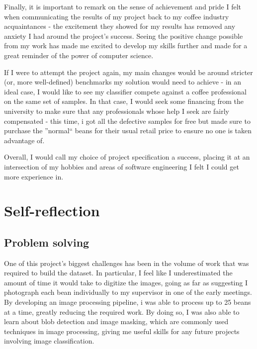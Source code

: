 \documentclass[12pt]{article}
\begin{document}
    Finally, it is important to remark on the sense of achievement and pride I felt when communicating the results of my project back to my
    coffee industry acquaintances - the excitement they showed for my results has removed any anxiety I had around the project's success.
    Seeing the positive change possible from my work has made me excited to develop my skills further and made for a great reminder of the power of computer science.

    If I were to attempt the project again, my main changes would be around stricter (or, more well-defined) benchmarks my solution would need to achieve -
    in an ideal case, I would like to see my classifier compete against a coffee professional on the same set of samples.
    In that case, I would seek some financing from the university to make sure that any professionals whose help I seek are fairly compensated -
    this time, i got all the defective samples for free but made sure to purchase the ''normal`` beans for their usual retail price to ensure no one is taken advantage of.

    Overall, I would call my choice of project specification a success, placing it at an intersection of my hobbies and areas of software engineering I felt I could get more experience in.

    \section{Self-reflection}
    \label{sec:section-2}

    \subsection{Problem solving}
    \label{subsec:problem-solving}
    One of this project's biggest challenges has been in the volume of work that was required to build the dataset.
    In particular, I feel like I underestimated the amount of time it would take to digitize the images, going as far as
    suggesting I photograph each bean individually to my supervisor in one of the early meetings.
    By developing an image processing pipeline, i was able to process up to 25 beans at a time, greatly reducing the required work.
    By doing so, I was also able to learn about blob detection and image masking, which are commonly used techniques in image processing,
    giving me useful skills for any future projects involving image classification.
\end{document}
